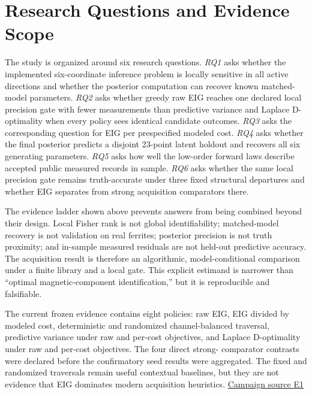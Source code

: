 \hypertarget{research-questions-and-evidence-scope}{%
\section{Research Questions and Evidence
Scope}\label{research-questions-and-evidence-scope}}

The study is organized around six research questions. \emph{RQ1} asks
whether the implemented six-coordinate inference problem is locally
sensitive in all active directions and whether the posterior computation
can recover known matched-model parameters. \emph{RQ2} asks whether
greedy raw EIG reaches one declared local precision gate with fewer
measurements than predictive variance and Laplace D-optimality when
every policy sees identical candidate outcomes. \emph{RQ3} asks the
corresponding question for EIG per prespecified modeled cost. \emph{RQ4}
asks whether the final posterior predicts a disjoint 23-point latent
holdout and recovers all six generating parameters. \emph{RQ5} asks how
well the low-order forward laws describe accepted public measured
records in sample. \emph{RQ6} asks whether the same local precision gate
remains truth-accurate under three fixed structural departures and
whether EIG separates from strong acquisition comparators there.

The evidence ladder shown above prevents answers from being combined
beyond their design. Local Fisher rank is not global identifiability;
matched-model recovery is not validation on real ferrites; posterior
precision is not truth proximity; and in-sample measured residuals are
not held-out predictive accuracy. The acquisition result is therefore an
algorithmic, model-conditional comparison under a finite library and a
local gate. This explicit estimand is narrower than ``optimal
magnetic-component identification,'' but it is reproducible and
falsifiable.

The current frozen evidence contains eight policies: raw EIG, EIG
divided by modeled cost, deterministic and randomized channel-balanced
traversal, predictive variance under raw and per-cost objectives, and
Laplace D-optimality under raw and per-cost objectives. The four direct
strong- comparator contrasts were declared before the confirmatory seed
results were aggregated. The fixed and randomized traversals remain
useful contextual baselines, but they are not evidence that EIG
dominates modern acquisition heuristics.
\href{https://github.com/hoangduong6210/EIG-bayesian-for-Recover-potential-Physical-Parameter-of-MagComponent/blob/927bbcb6d0b862598fae87d2575a872bbd79b5f1/wiki/evidence/Evidence-Sources.md\#e1}{Campaign
source E1}

